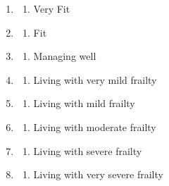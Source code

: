 \documentclass[
]{scrartcl}
\providecommand{\tightlist}{%
  \setlength{\itemsep}{0pt}\setlength{\parskip}{0pt}}\usepackage{longtable,booktabs,array}
\begin{document}
\begin{itemize}
  \begin{enumerate}
  \def\labelenumi{\arabic{enumi}.}
  \item
    \begin{enumerate}
    \def\labelenumii{\arabic{enumii}.}
    \tightlist
    \item
      Very Fit
    \end{enumerate}
  \item
    \begin{enumerate}
    \def\labelenumii{\arabic{enumii}.}
    \setcounter{enumii}{1}
    \tightlist
    \item
      Fit
    \end{enumerate}
  \item
    \begin{enumerate}
    \def\labelenumii{\arabic{enumii}.}
    \setcounter{enumii}{2}
    \tightlist
    \item
      Managing well
    \end{enumerate}
  \item
    \begin{enumerate}
    \def\labelenumii{\arabic{enumii}.}
    \setcounter{enumii}{3}
    \tightlist
    \item
      Living with very mild frailty
    \end{enumerate}
  \item
    \begin{enumerate}
    \def\labelenumii{\arabic{enumii}.}
    \setcounter{enumii}{4}
    \tightlist
    \item
      Living with mild frailty
    \end{enumerate}
  \item
    \begin{enumerate}
    \def\labelenumii{\arabic{enumii}.}
    \setcounter{enumii}{5}
    \tightlist
    \item
      Living with moderate frailty
    \end{enumerate}
  \item
    \begin{enumerate}
    \def\labelenumii{\arabic{enumii}.}
    \setcounter{enumii}{6}
    \tightlist
    \item
      Living with severe frailty
    \end{enumerate}
  \item
    \begin{enumerate}
    \def\labelenumii{\arabic{enumii}.}
    \setcounter{enumii}{7}
    \tightlist
    \item
      Living with very severe frailty

\end{enumerate}
\end{enumerate}
\end{itemize}
\end{document}
